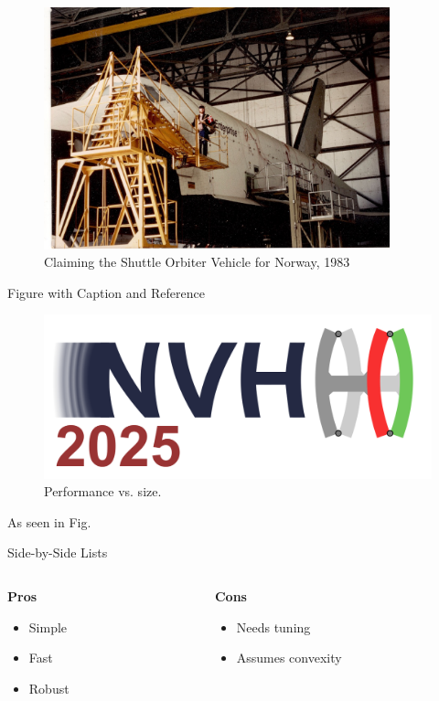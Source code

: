\documentclass[aspectratio=169,10pt]{beamer} \mode<presentation>
\begin{document}
\begin{frame}
  \begin{figure}
    \centering
    \includegraphics[width=0.65\linewidth,height=7cm]{Shuttle-1983}
    \caption{Claiming the Shuttle Orbiter Vehicle for Norway, 1983}
  \end{figure}
\end{frame}
\begin{frame}{Figure with Caption and Reference}
\begin{figure}
  \centering
  \includegraphics[width=0.7\linewidth]{logo.png}
  \caption{Performance vs. size.}
  \label{fig:perf}
\end{figure}
As seen in Fig.%
\end{frame}

\begin{frame}{Side-by-Side Lists}
\begin{columns}[T,onlytextwidth]
  \begin{column}{0.48\textwidth}
    \textbf{Pros}
    \begin{itemize}
      \item Simple
      \item Fast
      \item Robust
    \end{itemize}
  \end{column}
  \begin{column}{0.48\textwidth}
    \textbf{Cons}
    \begin{itemize}
      \item Needs tuning
      \item Assumes convexity
    \end{itemize}
  \end{column}
\end{columns}
\end{frame}
\end{document}
